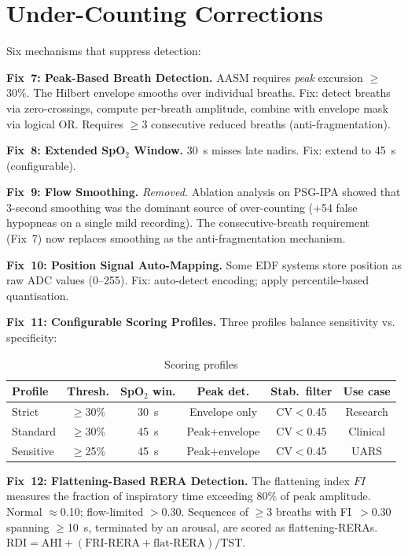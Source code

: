 \documentclass[11pt,a4paper]{article}
\begin{document}
\section{Under-Counting Corrections}
\label{sec:undercounting}

Six mechanisms that suppress detection:

\textbf{Fix~7: Peak-Based Breath Detection.}
AASM requires \emph{peak} excursion $\geq$30\%. The Hilbert envelope
smooths over individual breaths. Fix: detect breaths via zero-crossings,
compute per-breath amplitude, combine with envelope mask via logical OR.
Requires $\geq$3 consecutive reduced breaths (anti-fragmentation).

\textbf{Fix~8: Extended SpO$_2$ Window.}
30~s misses late nadirs. Fix: extend to 45~s (configurable).

\textbf{Fix~9: Flow Smoothing.}
\emph{Removed.} Ablation analysis on PSG-IPA showed that 3-second
smoothing was the dominant source of over-counting (+54 false hypopneas
on a single mild recording). The consecutive-breath requirement
(Fix~7) now replaces smoothing as the anti-fragmentation mechanism.

\textbf{Fix~10: Position Signal Auto-Mapping.}
Some EDF systems store position as raw ADC values (0--255). Fix:
auto-detect encoding; apply percentile-based quantisation.

\textbf{Fix~11: Configurable Scoring Profiles.}
Three profiles balance sensitivity vs. specificity:

\begin{table}[H]
\centering\small
\caption{Scoring profiles}
\begin{tabular}{@{}lccccc@{}}
\toprule
\textbf{Profile} & \textbf{Thresh.} & \textbf{SpO$_2$ win.} &
\textbf{Peak det.} & \textbf{Stab.\ filter} & \textbf{Use case} \\
\midrule
Strict    & $\geq$30\% & 30~s & Envelope only & CV$<$0.45 & Research \\
Standard  & $\geq$30\% & 45~s & Peak+envelope & CV$<$0.45 & Clinical \\
Sensitive & $\geq$25\% & 45~s & Peak+envelope & CV$<$0.45 & UARS \\
\bottomrule
\end{tabular}
\end{table}

\textbf{Fix~12: Flattening-Based RERA Detection.}
The flattening index $FI$ measures the fraction of inspiratory time
exceeding 80\% of peak amplitude. Normal $\approx$0.10; flow-limited
$>$0.30. Sequences of $\geq$3 breaths with FI~$>$0.30 spanning
$\geq$10~s, terminated by an arousal, are scored as flattening-RERAs.
$\text{RDI} = \text{AHI} + (\text{FRI-RERA} + \text{flat-RERA})/\text{TST}$.
\end{document}
